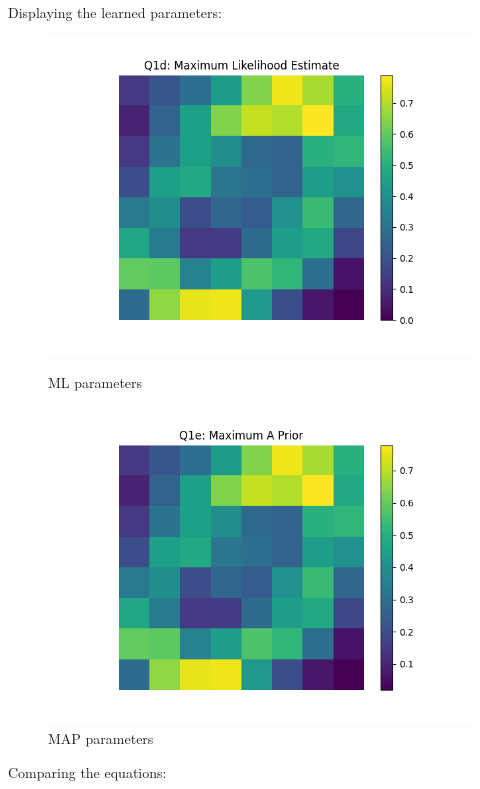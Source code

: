 \documentclass[12pt]{article}
\begin{document}
\begin{enumerate}
Displaying the learned parameters:
\begin{figure}[h]
\centering
\begin{minipage}{0.5\textwidth}
  \centering
  \includegraphics[scale=0.5]{outputs/python/q1/q1d}
  \caption{ML parameters}
  \label{fig:1d}
\end{minipage}%
\begin{minipage}{0.5\textwidth}
  \centering
  \includegraphics[scale=0.5]{outputs/python/q1/q1e}
  \caption{MAP parameters}
  \label{fig:1e}
\end{minipage}
\end{figure}

Comparing the equations:


\end{enumerate}
\end{document}
